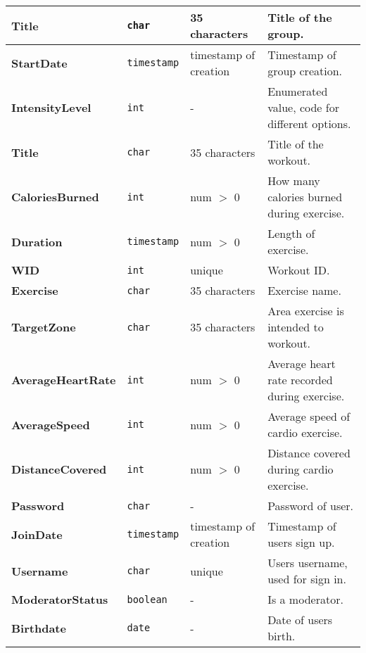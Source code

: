 \begin{adjustwidth}{-2.25cm}{}
\begin{center}
\begin{tabular}{l|lll}
        \textbf{Title}            & \texttt{char}      & 35 characters         & Title of the group.  \\ \midrule
        \textbf{StartDate}        & \texttt{timestamp} & timestamp of creation & Timestamp of group creation.  \\
        \textbf{IntensityLevel}   & \texttt{int}       & -                     & Enumerated value, code for different options.  \\
        \textbf{Title}            & \texttt{char}      & 35 characters         & Title of the workout.  \\
        \textbf{CaloriesBurned}   & \texttt{int}       & num $>$ 0             & How many calories burned during exercise.  \\ \midrule
        \textbf{Duration}         & \texttt{timestamp} & num $>$ 0             & Length of exercise.  \\
        \textbf{WID}              & \texttt{int}       & unique                & Workout ID.  \\
        \textbf{Exercise}         & \texttt{char}      & 35 characters         & Exercise name.  \\
        \textbf{TargetZone}       & \texttt{char}      & 35 characters         & Area exercise is intended to workout.  \\ \midrule
        \textbf{AverageHeartRate} & \texttt{int}       & num $>$ 0             & Average heart rate recorded during exercise.  \\
        \textbf{AverageSpeed}     & \texttt{int}       & num $>$ 0             & Average speed of cardio exercise.  \\
        \textbf{DistanceCovered}  & \texttt{int}       & num $>$ 0             & Distance covered during cardio exercise.  \\
        \textbf{Password}         & \texttt{char}      & -                     & Password of user.  \\ \midrule
        \textbf{JoinDate}         & \texttt{timestamp} & timestamp of creation & Timestamp of users sign up.  \\
        \textbf{Username}         & \texttt{char}      & unique                & Users username, used for sign in.  \\
        \textbf{ModeratorStatus}  & \texttt{boolean}   & -                     & Is a moderator.  \\
        \textbf{Birthdate}        & \texttt{date}      & -                     & Date of users birth.  \\ \midrule

\end{tabular}
\end{center}
\end{adjustwidth}
